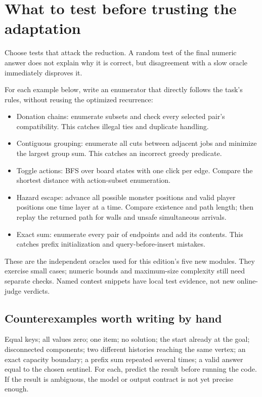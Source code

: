 \section{What to test before trusting the adaptation}
Choose tests that attack the reduction. A random test of the final numeric
answer does not explain why it is correct, but disagreement with a slow
oracle immediately disproves it.

For each example below, write an enumerator that directly follows the task's
rules, without reusing the optimized recurrence:
\begin{itemize}
\item Donation chains: enumerate subsets and check every selected pair's
compatibility. This catches illegal ties and duplicate handling.
\item Contiguous grouping: enumerate all cuts between adjacent jobs and
minimize the largest group sum. This catches an incorrect greedy predicate.
\item Toggle actions: BFS over board states with one click per edge. Compare
the shortest distance with action-subset enumeration.
\item Hazard escape: advance all possible monster positions and valid
player positions one time layer at a time. Compare existence and path length;
then replay the returned path for walls and unsafe simultaneous arrivals.
\item Exact sum: enumerate every pair of endpoints and add its contents.
This catches prefix initialization and query-before-insert mistakes.
\end{itemize}
These are the independent oracles used for this edition's five new modules.
They exercise small cases; numeric bounds and maximum-size complexity still
need separate checks. Named contest snippets have local test evidence, not
new online-judge verdicts.

\subsection{Counterexamples worth writing by hand}
Equal keys; all values zero; one item; no solution; the start already at the
goal; disconnected components; two different histories reaching the same
vertex; an exact capacity boundary; a prefix sum repeated several times;
a valid answer equal to the chosen sentinel. For each, predict the result
before running the code. If the result is ambiguous, the model or output
contract is not yet precise enough.

